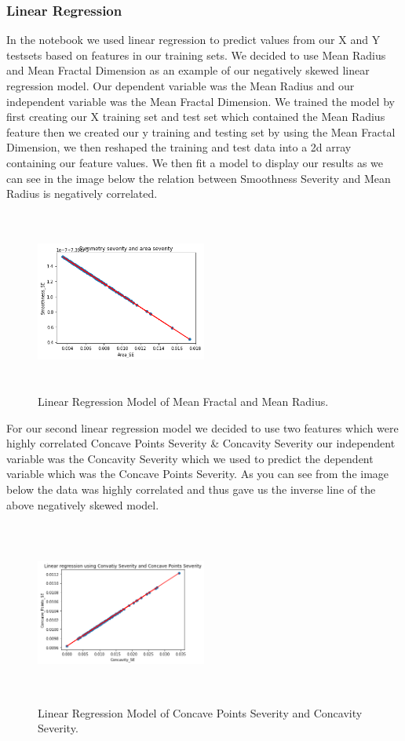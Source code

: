 \documentclass[conference]{IEEEtran}
\begin{document}
\subsubsection{Linear Regression}
In the notebook we used linear regression to predict values from our X and Y testsets based on features in our training sets.  We decided to use  Mean Radius  and Mean Fractal Dimension as an example of our negatively skewed linear regression model.  Our dependent variable was the Mean Radius and our independent variable was the Mean Fractal Dimension.   We trained the model by first creating our X training set and test set which contained the Mean Radius feature then we created our y training and testing set by using the Mean Fractal Dimension, we then reshaped the training and test data into a 2d array containing our feature values.  We then fit a model to display our results as we can see in the image below the relation between Smoothness Severity and Mean Radius is negatively correlated.
\begin{figure}[H]
\caption{Linear Regression Model of Mean Fractal and Mean Radius.}
\centering
\includegraphics[height=60mm,width=0.5\textwidth]{Images/negatively_skewed_linear_regression.png}
\end{figure}
For our second linear regression model we decided to use two features which were highly correlated Concave Points Severity \& Concavity Severity our independent variable was the  Concavity Severity which we used to predict the dependent variable which was the Concave Points Severity.  As you can see from the image below the data was highly correlated and thus gave us the inverse line of the above negatively skewed model.
\begin{figure}[H]
\caption{Linear Regression Model of Concave Points Severity and Concavity Severity.}
\centering
\includegraphics[height=60mm,width=0.5\textwidth]{Images/positively_skewed_linear_regression.png}
\end{figure}
\end{document}
